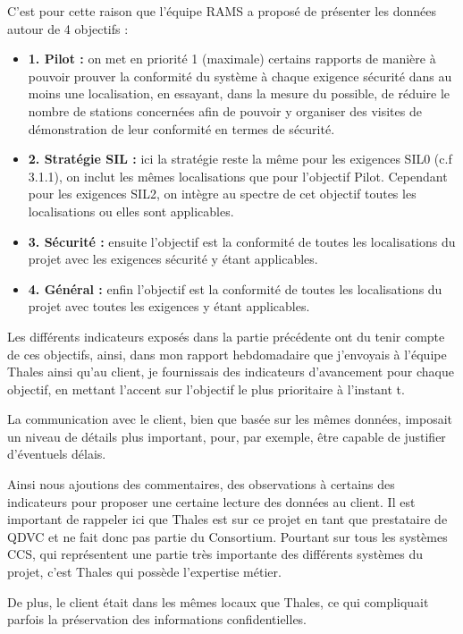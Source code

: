 C'est pour cette raison que l'équipe \gls{RAMS} a proposé de présenter les données autour de 4 objectifs :
\begin{itemize}
\item \textbf{1. Pilot :} on met en priorité 1 (maximale) certains rapports de manière à pouvoir prouver la conformité du système à chaque exigence sécurité dans au moins une localisation, en essayant, dans la mesure du possible, de réduire le nombre de stations concernées afin de pouvoir y organiser des visites de démonstration de leur conformité en termes de sécurité.
\item \textbf{2. Stratégie SIL :} ici la stratégie reste la même pour les exigences \gls{SIL}0 (c.f 3.1.1), on inclut les mêmes localisations que pour l'objectif Pilot. Cependant pour les exigences \gls{SIL}2, on intègre au spectre de cet objectif toutes les localisations ou elles sont applicables.
\item \textbf{3. Sécurité :} ensuite l'objectif est la conformité de toutes les localisations du projet avec les exigences sécurité y étant applicables.
\item \textbf{4. Général :} enfin l'objectif est la conformité de toutes les localisations du projet avec toutes les exigences y étant applicables.
\end{itemize}


Les différents indicateurs exposés dans la partie précédente ont du tenir compte de ces objectifs, ainsi, dans mon rapport hebdomadaire que j'envoyais à l'équipe Thales ainsi qu'au client, je fournissais des indicateurs d'avancement pour chaque objectif, en mettant l'accent sur l'objectif le plus prioritaire à l'instant t.


La communication avec le client, bien que basée sur les mêmes données, imposait un niveau de détails plus important, pour, par exemple, être capable de justifier d'éventuels délais.

Ainsi nous ajoutions des commentaires, des observations à certains des indicateurs pour proposer une certaine lecture des données au client.
Il est important de rappeler ici que Thales est sur ce projet en tant que prestataire de QDVC et ne fait donc pas partie du Consortium.
Pourtant sur tous les systèmes \gls{CCS}, qui représentent une partie très importante des différents systèmes du projet, c'est Thales qui possède l'expertise métier.

De plus, le client était dans les mêmes locaux que Thales, ce qui compliquait parfois la préservation des informations confidentielles.

